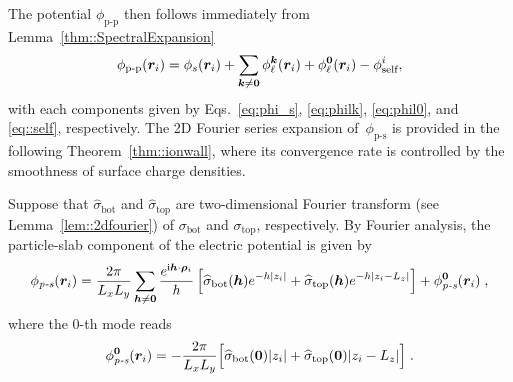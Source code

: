 The potential $\phi_{\text{p-p}}$ then follows immediately from Lemma~\ref{thm::SpectralExpansion}
\begin{equation}\label{eq::phiion-ion}
	\phi_{\text{p-p}}(\bm{r}_{i})=\phi_{s}(\bm{r}_{i}) + \sum_{\bm{k}\neq\bm{0}} \phi_{\ell}^{\boldsymbol{k}}(\bm{r}_{i}) + \phi_{\ell}^{\boldsymbol{0}}(\bm{r}_{i}) - \phi_{\text{self}}^{i},
\end{equation}
with each components given by Eqs.~\eqref{eq:phi_s}, \eqref{eq:philk}, \eqref{eq:phil0}, and \eqref{eq::self}, respectively. 
The 2D Fourier series expansion of~$\phi_{\text{p-s}}$ is provided in the following Theorem~\ref{thm::ionwall}, where its convergence rate is controlled by the smoothness of surface charge densities.
\begin{thm}\label{thm::ionwall}
	Suppose that $\widehat{\sigma}_{\mathrm{bot}}$ and $\widehat{\sigma}_{\mathrm{top}}$ are two-dimensional Fourier transform (see Lemma~\ref{lem::2dfourier}) of $\sigma_{\mathrm{bot}}$ and $\sigma_{\mathrm{top}}$, respectively. By Fourier analysis, the particle-slab component of the electric potential is given by
	\begin{equation}\label{eq::phiionwall}
		\phi_{\emph{p-s}}(\bm{r}_{i}) = \frac{2\pi}{L_xL_y}\sum_{\bm{h}\neq \bm{0}}\frac{e^{\mathrm{i} \bm{h}\cdot\bm{\rho}_{i}}}{h}\left[\widehat{\sigma}_{\mathrm{bot}}(\bm{h})e^{-h|z_{i}|}+\widehat{\sigma}_{\mathrm{top}}(\bm{h})e^{-h|z_{i}-L_z|}\right]+\phi_{\emph{p-s}}^{\bm{0}}(\bm{r}_{i})\;,
	\end{equation}
	where the 0-th mode reads
	\begin{equation}\label{eq::phionwallzero}
		\phi_{\emph{p-s}}^{\bm{0}}(\bm{r}_{i})=-\frac{2\pi}{L_xL_y}\Big[\widehat{\sigma}_{\mathrm{bot}}(\bm{0})|z_{i}|+\widehat{\sigma}_{\mathrm{top}}(\bm{0})|z_{i}-L_z|\Big]\;.
	\end{equation}
\end{thm}
